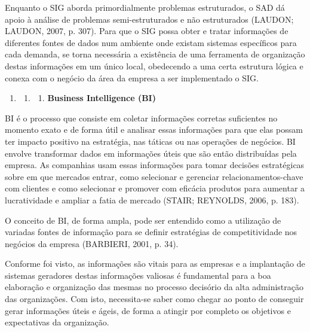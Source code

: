 \documentclass[a4paper]{article}
\newcounter{saveenum}
\newcommand\liststyleWWviiiNumi{%
\renewcommand\theenumi{\arabic{enumi}}
\renewcommand\theenumii{\arabic{enumi}.\arabic{enumii}}
\renewcommand\theenumiii{\arabic{enumi}.\arabic{enumii}.\arabic{enumiii}}
\renewcommand\theenumiv{\arabic{enumi}.\arabic{enumii}.\arabic{enumiii}.\arabic{enumiv}}
\renewcommand\labelenumi{\theenumi}
\renewcommand\labelenumii{\theenumii}
\renewcommand\labelenumiii{\theenumiii}
\renewcommand\labelenumiv{\theenumiv.}
}
\begin{document}
{
\textsf{Enquanto o SIG aborda primordialmente problemas estruturados, o SAD d\'a apoio \`a an\'alise de problemas
semi-estruturados e n\~ao estruturados (LAUDON; LAUDON, 2007, p. 307). Para que o SIG possa obter e tratar
informa\c{c}\~oes de diferentes fontes de dados num ambiente onde existam sistemas espec\'ificos para cada demanda, se
torna necess\'aria a exist\^encia de uma ferramenta de organiza\c{c}\~ao destas informa\c{c}\~oes em um \'unico local,
obedecendo a uma certa estrutura l\'ogica e conexa com o neg\'ocio da \'area da empresa a ser implementado o SIG.}}


\bigskip

\liststyleWWviiiNumi
\setcounter{saveenum}{\value{enumi}}
\begin{enumerate}
\setcounter{enumi}{\value{saveenum}}
\item \setcounter{saveenum}{\value{enumii}}
\begin{enumerate}
\setcounter{enumii}{\value{saveenum}}
\item \setcounter{saveenum}{\value{enumiii}}
\begin{enumerate}
\setcounter{enumiii}{\value{saveenum}}
\item {
\textsf{\textbf{Business Intelligence (BI)}}}
\end{enumerate}
\end{enumerate}
\end{enumerate}
{\sffamily
BI \'e o processo que consiste em coletar informa\c{c}\~oes corretas suficientes no momento exato e de forma \'util e
analisar essas informa\c{c}\~oes para que elas possam ter impacto positivo na estrat\'egia, nas t\'aticas ou nas
opera\c{c}\~oes de neg\'ocios. BI envolve transformar dados em informa\c{c}\~oes \'uteis que s\~ao ent\~ao
distribu\'idas pela empresa. As companhias usam essas informa\c{c}\~oes para tomar decis\~oes estrat\'egicas sobre em
que mercados entrar, como selecionar e gerenciar relacionamentos-chave com clientes e como selecionar e promover com
efic\'acia produtos para aumentar a lucratividade e ampliar a fatia de mercado (STAIR; REYNOLDS, 2006, p. 183).}

{\sffamily
O conceito de BI, de forma ampla, pode ser entendido como a utiliza\c{c}\~ao de variadas fontes de informa\c{c}\~ao para
se definir estrat\'egias de competitividade nos neg\'ocios da empresa (BARBIERI, 2001, p. 34).}

{\sffamily
Conforme foi visto, as informa\c{c}\~oes s\~ao vitais para as empresas e a implanta\c{c}\~ao de sistemas geradores
destas informa\c{c}\~oes valiosas \'e fundamental para a boa elabora\c{c}\~ao e organiza\c{c}\~ao das mesmas no
processo decis\'orio da alta administra\c{c}\~ao das organiza\c{c}\~oes. Com isto, necessita-se saber como chegar ao
ponto de conseguir gerar informa\c{c}\~oes \'uteis e \'ageis, de forma a atingir por completo os objetivos e
expectativas da organiza\c{c}\~ao.}
\end{document}
